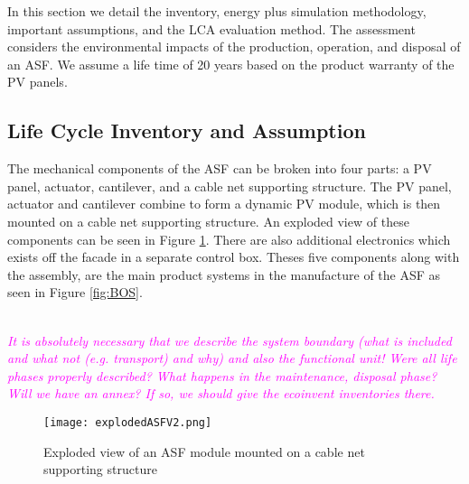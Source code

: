 
In this section we detail the inventory, energy plus simulation methodology, important assumptions, and the LCA evaluation method. The assessment considers the environmental impacts of the production, operation, and disposal of an ASF. We assume a life time of 20 years based on the product warranty of the PV panels.
\\

\subsection{Life Cycle Inventory and Assumption}

The mechanical components of the ASF can be broken into four parts: a PV panel, actuator, cantilever, and a cable net supporting structure. The PV panel, actuator and cantilever combine to form a dynamic PV module, which is then mounted on a cable net supporting structure. An exploded view of these components can be seen in Figure \ref{fig:explodedView}. There are also additional electronics which exists off the facade in a separate control box. Theses five components along with the assembly, are the main product systems in the manufacture of the ASF as seen in Figure \ref{fig:BOS}. 

\textcolor{magenta}{\textit{\\It is absolutely necessary that we describe the system boundary (what is included and what not (e.g. transport) and why) and also the functional unit! Were all life phases properly described? What happens in the maintenance, disposal phase? Will we have an annex? If so, we should give the ecoinvent inventories there.}}



\begin{figure}[H]
\begin{center}
\texttt{[image: explodedASFV2.png]}
\caption{Exploded view of an ASF module mounted on a cable net supporting structure}
\label{fig:explodedView}
\end{center}
\end{figure}

